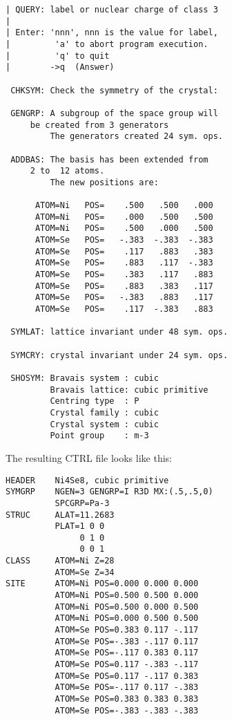 \documentclass[aps,twocolumn,a4]{revtex4}
\begin{document}
\begin{enumerate}
\begin{verbatim}
| QUERY: label or nuclear charge of class 3
|
| Enter: 'nnn', nnn is the value for label,
|         'a' to abort program execution.
|         'q' to quit
|        ->q  (Answer)

 CHKSYM: Check the symmetry of the crystal:

 GENGRP: A subgroup of the space group will
	 be created from 3 generators
         The generators created 24 sym. ops.

 ADDBAS: The basis has been extended from
	 2 to  12 atoms.
         The new positions are:

      ATOM=Ni   POS=    .500   .500   .000
      ATOM=Ni   POS=    .000   .500   .500
      ATOM=Ni   POS=    .500   .000   .500
      ATOM=Se   POS=   -.383  -.383  -.383
      ATOM=Se   POS=    .117   .883   .383
      ATOM=Se   POS=    .883   .117  -.383
      ATOM=Se   POS=    .383   .117   .883
      ATOM=Se   POS=    .883   .383   .117
      ATOM=Se   POS=   -.383   .883   .117
      ATOM=Se   POS=    .117  -.383   .883

 SYMLAT: lattice invariant under 48 sym. ops.

 SYMCRY: crystal invariant under 24 sym. ops.

 SHOSYM: Bravais system : cubic
         Bravais lattice: cubic primitive
         Centring type  : P
         Crystal family : cubic
         Crystal system : cubic
         Point group    : m-3

\end{verbatim}

The resulting CTRL file looks like this:
\begin{verbatim}
HEADER    Ni4Se8, cubic primitive
SYMGRP    NGEN=3 GENGRP=I R3D MX:(.5,.5,0)
          SPCGRP=Pa-3
STRUC     ALAT=11.2683
          PLAT=1 0 0
               0 1 0
               0 0 1
CLASS     ATOM=Ni Z=28
          ATOM=Se Z=34
SITE      ATOM=Ni POS=0.000 0.000 0.000
          ATOM=Ni POS=0.500 0.500 0.000
          ATOM=Ni POS=0.500 0.000 0.500
          ATOM=Ni POS=0.000 0.500 0.500
          ATOM=Se POS=0.383 0.117 -.117
          ATOM=Se POS=-.383 -.117 0.117
          ATOM=Se POS=-.117 0.383 0.117
          ATOM=Se POS=0.117 -.383 -.117
          ATOM=Se POS=0.117 -.117 0.383
          ATOM=Se POS=-.117 0.117 -.383
          ATOM=Se POS=0.383 0.383 0.383
          ATOM=Se POS=-.383 -.383 -.383
\end{verbatim}


\end{enumerate}
\end{document}
